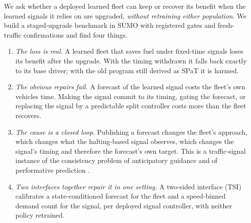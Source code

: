 \documentclass[11pt]{article}
\begin{document}
We ask whether a deployed learned fleet can keep or recover its benefit when the learned signals it relies on are upgraded,
\emph{without retraining either population}. We build a staged-upgrade benchmark in SUMO \cite{lopez2018} with registered gates and
fresh-traffic confirmations and find four things.
\begin{enumerate}\setlength\itemsep{1pt}
\item \emph{The loss is real.} A learned fleet that saves fuel under fixed-time signals loses its benefit after the upgrade. With the
timing withdrawn it falls back exactly to its base driver; with the old program still derived as SPaT it is harmed.
\item \emph{The obvious repairs fail.} A forecast of the learned signal costs the fleet's own vehicles time. Making the signal commit to
its timing, gating the forecast, or replacing the signal by a predictable split controller costs more than the fleet recovers.
\item \emph{The cause is a closed loop.} Publishing a forecast changes the fleet's approach, which changes what the halting-based signal
observes, which changes the signal's timing and therefore the forecast's own target. This is a traffic-signal instance of the consistency
problem of anticipatory guidance \cite{bottom2000} and of performative prediction \cite{perdomo2020,narang2023}.
\item \emph{Two interfaces together repair it in one setting.} A two-sided interface (TSI) calibrates a state-conditioned forecast for the
fleet and a speed-binned demand count for the signal, per deployed signal controller, with neither policy retrained.
\end{enumerate}
\end{document}
